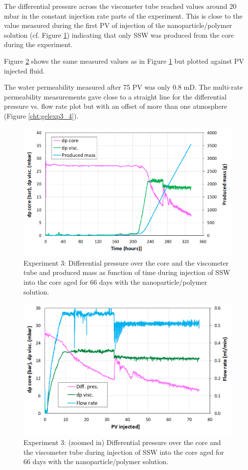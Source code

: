 The differential pressure across the viscometer tube reached values around 20 mbar in the constant injection rate parts of the experiment. This is close to the value measured during the first PV of injection of the nanoparticle/polymer solution (cf. Figure \ref{cht:gelexp3_2}) indicating that only SSW was produced from the core during the experiment.

Figure \ref{cht:gelexp3_3} shows the same measured values as in Figure \ref{cht:gelexp3_2} but plotted against PV injected fluid.

The water permeability measured after 75 PV was only 0.8 mD. The multi-rate permeability measurements gave close to a straight line for the differential pressure vs. flow rate plot but with an offset of more than one atmosphere (Figure \ref{cht:gelexp3_4}).


\begin{figure}[h!]
    \centering
    \includegraphics[width=\textwidth]{img/cht/gelexp3_2.png}
    \caption{Experiment 3: Differential pressure over the core and the viscometer tube and produced mass as function of time during injection of SSW into the core aged for 66 days with the nanoparticle/polymer solution.}
    \label{cht:gelexp3_2} %
\end{figure}

\begin{figure}[h!]
    \centering
    \includegraphics[width=\textwidth]{img/cht/gelexp3_3.png}
    \caption{Experiment 3: (zoomed in) Differential pressure over the core and the viscometer tube during injection of SSW into the core aged for 66 days with the nanoparticle/polymer solution.}
    \label{cht:gelexp3_3} %
\end{figure}

